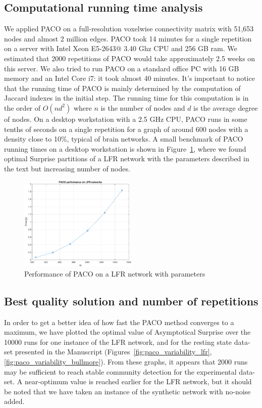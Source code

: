 \subsection{Computational running time analysis}
We applied PACO on a full-resolution voxelwise connectivity matrix with 51,653 nodes and almost 2 million edges. PACO took 14 minutes for a single repetition on a server with Intel Xeon E5-2643@ 3.40 Ghz CPU and 256 GB ram.
We estimated that 2000 repetitions of PACO would take approximately 2.5 weeks on this server. We also tried to run PACO on a standard office PC with 16 GB memory and an Intel Core i7: it took almost 40 minutes. It’s important to notice that the running time of PACO is mainly determined by the computation of Jaccard indexes in the initial step.
The running time for this computation is in the order of $O(nd^2)$ where $n$ is the number of nodes and $d$ is the average degree of nodes. On a desktop workstation with a 2.5 GHz CPU, PACO runs in some tenths of seconds on a single repetition for a graph of around 600 nodes with a density close to 10\%, typical of brain networks. A small benchmark of PACO running times on a desktop workstation is shown in Figure~\ref{fig:paco_benchmark}, where we found optimal Surprise partitions of a LFR network with the parameters described in the text but increasing number of nodes.

\begin{figure}[htb!]
\centering
\includegraphics[width=0.5\textwidth]{images/paco_benchmark.pdf}
\caption{Performance of PACO on a LFR network with parameters}
\label{fig:paco_benchmark}
\end{figure}

\subsection{Best quality solution and number of repetitions}
In order to get a better idea of how fast the PACO method converges to a maximum, we have plotted the optimal value of Asymptotical Surprise over the 10000 runs for one instance of the LFR network, and for the resting state data-set presented in the Manuscript (Figures~\ref{fig:paco_variability_lfr},\ref{fig:paco_variability_bullmore}).
From these graphs, it appears that 2000 runs may be sufficient to reach stable community detection for the experimental data-set. A near-optimum value is reached earlier for the LFR network, but it should be noted that we have taken an instance of the synthetic network with no-noise added.

